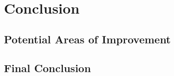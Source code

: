 \chapter{Conclusion}\label{ch:conclusion}

\section{Potential Areas of Improvement}\label{sec:potential-areas-of-improvement}


\section{Final Conclusion}\label{sec:final-conclusion}

